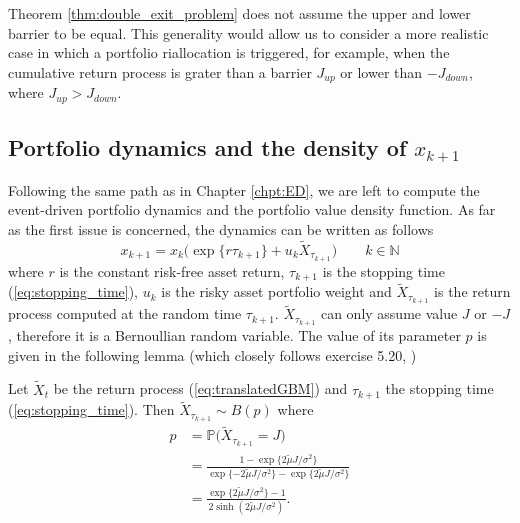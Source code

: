 \begin{remark}
	Theorem \ref{thm:double_exit_problem} does not assume the upper and lower barrier to be equal. This generality would allow us to consider a more realistic case in which a portfolio riallocation is triggered, for example, when the cumulative return process is grater than a barrier $J_{up}$ or lower than $-J_{down}$, where $J_{up} > J_{down}$.
\end{remark}
\subsection{Portfolio dynamics and the density of $x_{k+1}$}
Following the same path as in Chapter \ref{chpt:ED}, we are left to compute the event-driven portfolio dynamics and the portfolio value density function. As far as the first issue is concerned, the dynamics can be written as follows
\begin{equation}\label{eq:GBM_portfolio_dynamics}
\boxed{x_{k+1}=x_k\big(\exp\{r\tau_{k+1}\} + u_k\widetilde{X}_{\tau_{k+1}}\big)} \qquad k \in \mathbb{N}
\end{equation}
where $r$ is the constant risk-free asset return, $\tau_{k+1}$ is the stopping time (\ref{eq:stopping_time}), $u_k$ is the risky asset portfolio weight and $\widetilde{X}_{\tau_{k+1}}$ is the return process computed at the random time $\tau_{k+1}$. $\widetilde{X}_{\tau_{k+1}}$ can only assume value $J$ or $-J$, therefore it is a Bernoullian random variable. The value of its parameter $p$ is given in the following lemma (which closely follows exercise 5.20, \cite{baldi2017})
\begin{lemma}\label{lemma:probability_positive_jump}
	Let $\widetilde{X}_t$ be the return process (\ref{eq:translatedGBM}) and $\tau_{k+1}$ the stopping time (\ref{eq:stopping_time}). Then $\widetilde{X}_{\tau_{k+1}} \sim B(p)$ where 
	\begin{align}
	p &= \mathbb{P}\Big(\widetilde{X}_{\tau_{k+1}}=J\Big)\\[2ex]\nonumber
	&=\frac{1-\exp\{2\widetilde{\mu}J/\sigma^2\}}{\exp\{-2\widetilde{\mu}J/\sigma^2\} - \exp\{2\widetilde{\mu}J/\sigma^2\}} \\[2ex]\nonumber
	& = \frac{\exp\{2\widetilde{\mu}J/\sigma^2\}-1}{2\sinh(2\widetilde{\mu}J/\sigma^2)}.
	\end{align}
\end{lemma}
